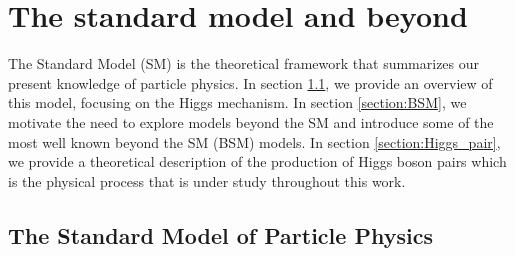 
\chapter{The standard model and beyond}
\label{chapter:SM}

The Standard Model (SM) is the theoretical framework that summarizes our present knowledge of particle physics. In section \ref{section:overview_SM}, we provide an overview of this model, focusing on the Higgs mechanism. In section \ref{section:BSM}, we motivate the need to explore models beyond the SM and introduce some of the most well known beyond the SM (BSM) models. In section \ref{section:Higgs_pair}, we provide a theoretical description of the production of Higgs boson pairs which is the physical process that is under study throughout this work.


\section{The Standard Model of Particle Physics}
\label{section:overview_SM}

